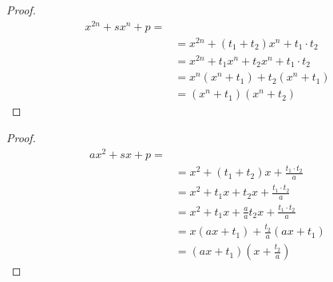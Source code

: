 \begin{proof}
	\begin{align*}
	x^{2n}+sx^n+p=&\\
	&=x^{2n}+(t_1+t_2)x^n+t_1\cdot t_2\\
	&=x^{2n}+t_1x^n+t_2x^n+t_1\cdot t_2\\
	&=x^n(x^n+t_1)+t_2(x^n+t_1)\\
	&=(x^n+t_1)(x^n+t_2)
	\end{align*}
\end{proof}
\begin{proof}
	\begin{align*}
	ax^{2}+sx+p=&\\
	&=x^{2}+(t_1+t_2)x+\frac{t_1\cdot t_2}{a}\\
	&=x^{2}+t_1x+t_2x+\frac{t_1\cdot t_2}{a}\\
	&=x^{2}+t_1x+\frac{a}{a}t_2x+\frac{t_1\cdot t_2}{a}\\
	&=x(ax+t_1)+\frac{t_2}{a}(ax+t_1)\\
	&=(ax+t_1)\left(x+\frac{t_2}{a}\right)
	\end{align*}
\end{proof}

